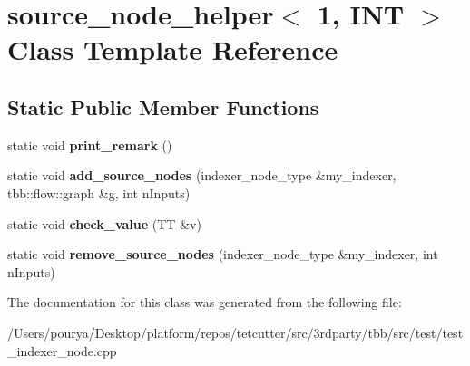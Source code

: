 \hypertarget{classsource__node__helper_3_011_00_01INT_01_4}{}\section{source\+\_\+node\+\_\+helper$<$ 1, I\+N\+T $>$ Class Template Reference}
\label{classsource__node__helper_3_011_00_01INT_01_4}
\subsection*{Static Public Member Functions}
\begin{DoxyCompactItemize}
\item 
\hypertarget{classsource__node__helper_3_011_00_01INT_01_4_a374874f02e3978299ca6cfe09ca966e8}{}static void {\bfseries print\+\_\+remark} ()\label{classsource__node__helper_3_011_00_01INT_01_4_a374874f02e3978299ca6cfe09ca966e8}

\item 
\hypertarget{classsource__node__helper_3_011_00_01INT_01_4_a5062910169ef0a27aacb163f19e88484}{}static void {\bfseries add\+\_\+source\+\_\+nodes} (indexer\+\_\+node\+\_\+type \&my\+\_\+indexer, tbb\+::flow\+::graph \&g, int n\+Inputs)\label{classsource__node__helper_3_011_00_01INT_01_4_a5062910169ef0a27aacb163f19e88484}

\item 
\hypertarget{classsource__node__helper_3_011_00_01INT_01_4_af4391aee0f275f70fd4af155f4cb0ba9}{}static void {\bfseries check\+\_\+value} (T\+T \&v)\label{classsource__node__helper_3_011_00_01INT_01_4_af4391aee0f275f70fd4af155f4cb0ba9}

\item 
\hypertarget{classsource__node__helper_3_011_00_01INT_01_4_a439cac7096df2b542b249daaa2ae047f}{}static void {\bfseries remove\+\_\+source\+\_\+nodes} (indexer\+\_\+node\+\_\+type \&my\+\_\+indexer, int n\+Inputs)\label{classsource__node__helper_3_011_00_01INT_01_4_a439cac7096df2b542b249daaa2ae047f}

\end{DoxyCompactItemize}


The documentation for this class was generated from the following file\+:\begin{DoxyCompactItemize}
\item 
/\+Users/pourya/\+Desktop/platform/repos/tetcutter/src/3rdparty/tbb/src/test/test\+\_\+indexer\+\_\+node.\+cpp\end{DoxyCompactItemize}
